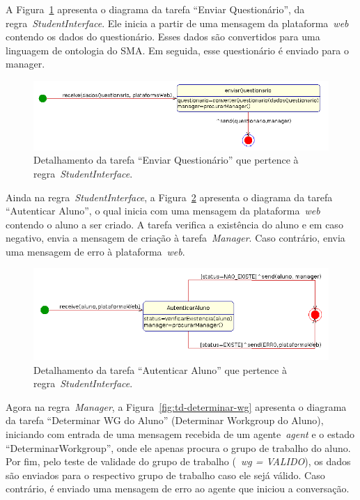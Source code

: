 A Figura~\ref{fig:td-enviar-quest} apresenta o diagrama da tarefa ``Enviar Questionário'', da regra~\emph{StudentInterface}. Ele inicia a partir de uma mensagem da plataforma~\emph{web} contendo os dados do questionário. Esses dados são convertidos para uma linguagem de ontologia do SMA. Em seguida, esse questionário é enviado para o manager.

\begin{figure}
	\centering
	\includegraphics[scale=0.48]{images/td-enviar-quest.png}
	\caption{Detalhamento da tarefa ``Enviar Questionário'' que pertence à regra~\emph{StudentInterface}.}
	\label{fig:td-enviar-quest}
\end{figure}

Ainda na regra~\emph{StudentInterface}, a Figura~\ref{fig:td-autenticar-aluno} apresenta o diagrama da tarefa ``Autenticar Aluno'', o qual inicia com uma mensagem da plataforma~\emph{web} contendo o aluno a ser criado. A tarefa verifica a existência do aluno e em caso negativo, envia a mensagem de criação à tarefa~\emph{Manager}. Caso contrário, envia uma mensagem de erro à plataforma~\emph{web}.

\begin{figure}
	\centering
	\includegraphics[scale=0.48]{images/td-autenticar-aluno.png}
	\caption{Detalhamento da tarefa ``Autenticar Aluno'' que pertence à regra~\emph{StudentInterface}.}
	\label{fig:td-autenticar-aluno}
\end{figure}

Agora na regra~\emph{Manager}, a Figura~\ref{fig:td-determinar-wg} apresenta o diagrama da tarefa ``Determinar WG do Aluno'' (Determinar Workgroup do Aluno), iniciando com entrada de uma mensagem recebida de um agente~\emph{agent} e o estado ``DeterminarWorkgroup'', onde ele apenas procura o grupo de trabalho do aluno. Por fim, pelo teste de validade do grupo de trabalho (~\emph{wg = VALIDO}), os dados são enviados para o respectivo grupo de trabalho caso ele sejá válido. Caso contrário, é enviado uma mensagem de erro ao agente que iniciou a conversação.

